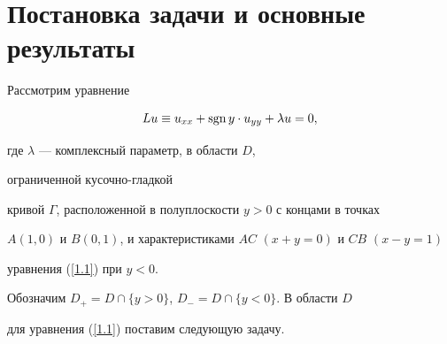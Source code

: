 \maketitle


\label{begin}








\section{Постановка задачи и основные результаты}





Рассмотрим уравнение


\begin{equation}


Lu\equiv u_{xx}+\sgn y\cdot u_{yy}+\lambda u=0,\label{1.1}


\end{equation}


где $\lambda$ --- комплексный параметр, в области $D$, 


ограниченной кусочно-гладкой 


кривой $\Gamma$, расположенной в полуплоскости $y>0$ с концами в точках 


$A(1,0)$ и $B(0,1)$, и характеристиками $AC$ $(x+y=0)$ и $CB$ $(x-y=1)$ 


уравнения (\ref{1.1}) при $y<0$.





Обозначим $D_+=D\cap\{y>0\}$, $D_-=D\cap\{y<0\}$. В области $D$ 


для уравнения (\ref{1.1}) поставим следующую задачу.


\medskip





